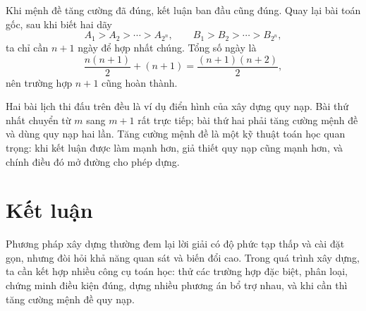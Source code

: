 \documentclass[11pt]{article}
\begin{document}
Khi mệnh đề tăng cường đã đúng, kết luận ban đầu cũng đúng. Quay lại bài toán
gốc, sau khi biết hai dãy
\[
  A_1>A_2>\cdots>A_{2^n},\qquad
  B_1>B_2>\cdots>B_{2^n},
\]
ta chỉ cần $n+1$ ngày để hợp nhất chúng. Tổng số ngày là
\[
  \frac{n(n+1)}{2}+(n+1)=\frac{(n+1)(n+2)}{2},
\]
nên trường hợp $n+1$ cũng hoàn thành.

Hai bài lịch thi đấu trên đều là ví dụ điển hình của xây dựng quy nạp. Bài
thứ nhất chuyển từ $m$ sang $m+1$ rất trực tiếp; bài thứ hai phải tăng cường
mệnh đề và dùng quy nạp hai lần. Tăng cường mệnh đề là một kỹ thuật toán học
quan trọng: khi kết luận được làm mạnh hơn, giả thiết quy nạp cũng mạnh hơn,
và chính điều đó mở đường cho phép dựng.

\section{Kết luận}

Phương pháp xây dựng thường đem lại lời giải có độ phức tạp thấp và cài đặt
gọn, nhưng đòi hỏi khả năng quan sát và biến đổi cao. Trong quá trình xây
dựng, ta cần kết hợp nhiều công cụ toán học: thử các trường hợp đặc biệt,
phân loại, chứng minh điều kiện đúng, dựng nhiều phương án bổ trợ nhau, và
khi cần thì tăng cường mệnh đề quy nạp.
\end{document}
